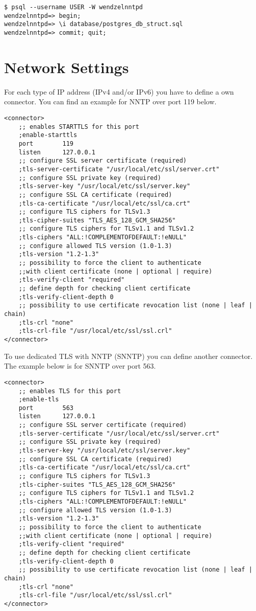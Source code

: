 \begin{verbatim}
$ psql --username USER -W wendzelnntpd
wendzelnntpd=> begin;
wendzelnntpd=> \i database/postgres_db_struct.sql
wendzelnntpd=> commit; quit;
\end{verbatim}

\section{Network Settings}\label{network-settings}

For each type of IP address (IPv4 and/or IPv6) you have to define a own connector. You can find an example for NNTP over port 119 below.

\begin{verbatim}
<connector>
	;; enables STARTTLS for this port
	;enable-starttls
	port		119
	listen	    127.0.0.1
	;; configure SSL server certificate (required)
	;tls-server-certificate "/usr/local/etc/ssl/server.crt"
	;; configure SSL private key (required)
	;tls-server-key "/usr/local/etc/ssl/server.key"
	;; configure SSL CA certificate (required)
	;tls-ca-certificate "/usr/local/etc/ssl/ca.crt"
	;; configure TLS ciphers for TLSv1.3
	;tls-cipher-suites "TLS_AES_128_GCM_SHA256"
	;; configure TLS ciphers for TLSv1.1 and TLSv1.2
	;tls-ciphers "ALL:!COMPLEMENTOFDEFAULT:!eNULL"
	;; configure allowed TLS version (1.0-1.3)
	;tls-version "1.2-1.3"
	;; possibility to force the client to authenticate 
	;;with client certificate (none | optional | require)
	;tls-verify-client "required"
	;; define depth for checking client certificate
	;tls-verify-client-depth 0
	;; possibility to use certificate revocation list (none | leaf | chain)
	;tls-crl "none"
	;tls-crl-file "/usr/local/etc/ssl/ssl.crl"
</connector>
\end{verbatim}

To use dedicated TLS with NNTP (SNNTP) you can define another connector. The example below is for SNNTP over port 563.

\begin{verbatim}
<connector>
	;; enables TLS for this port
	;enable-tls
	port		563
	listen	    127.0.0.1
	;; configure SSL server certificate (required)
	;tls-server-certificate "/usr/local/etc/ssl/server.crt"
	;; configure SSL private key (required)
	;tls-server-key "/usr/local/etc/ssl/server.key"
	;; configure SSL CA certificate (required)
	;tls-ca-certificate "/usr/local/etc/ssl/ca.crt"
	;; configure TLS ciphers for TLSv1.3
	;tls-cipher-suites "TLS_AES_128_GCM_SHA256"
	;; configure TLS ciphers for TLSv1.1 and TLSv1.2
	;tls-ciphers "ALL:!COMPLEMENTOFDEFAULT:!eNULL"
	;; configure allowed TLS version (1.0-1.3)
	;tls-version "1.2-1.3"
	;; possibility to force the client to authenticate 
	;;with client certificate (none | optional | require)
	;tls-verify-client "required"
	;; define depth for checking client certificate
	;tls-verify-client-depth 0
	;; possibility to use certificate revocation list (none | leaf | chain)
	;tls-crl "none"
	;tls-crl-file "/usr/local/etc/ssl/ssl.crl"
</connector>
\end{verbatim}

